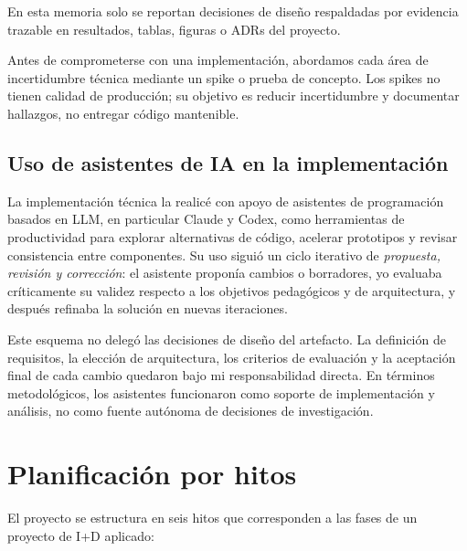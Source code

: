 En esta memoria solo se reportan decisiones de diseño respaldadas por evidencia trazable en resultados, tablas, figuras o ADRs del proyecto.

Antes de comprometerse con una implementación, abordamos cada área de incertidumbre técnica mediante un spike o prueba de concepto. Los spikes no tienen calidad de producción; su objetivo es reducir incertidumbre y documentar hallazgos, no entregar código mantenible.

\subsection{Uso de asistentes de IA en la implementación}

La implementación técnica la realicé con apoyo de asistentes de programación basados en LLM, en particular Claude y Codex, como herramientas de productividad para explorar alternativas de código, acelerar prototipos y revisar consistencia entre componentes. Su uso siguió un ciclo iterativo de \textit{propuesta, revisión y corrección}: el asistente proponía cambios o borradores, yo evaluaba críticamente su validez respecto a los objetivos pedagógicos y de arquitectura, y después refinaba la solución en nuevas iteraciones.

Este esquema no delegó las decisiones de diseño del artefacto. La definición de requisitos, la elección de arquitectura, los criterios de evaluación y la aceptación final de cada cambio quedaron bajo mi responsabilidad directa. En términos metodológicos, los asistentes funcionaron como soporte de implementación y análisis, no como fuente autónoma de decisiones de investigación.

\section{Planificación por hitos}

El proyecto se estructura en seis hitos que corresponden a las fases de un proyecto de I+D aplicado:

